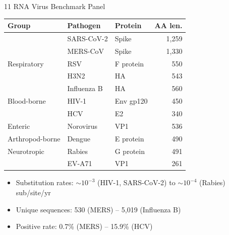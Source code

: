 \begin{frame}{11 RNA Virus Benchmark Panel}
  \footnotesize
  \begin{tabular}{lllr}
    \toprule
    \textbf{Group} & \textbf{Pathogen} & \textbf{Protein} & \textbf{AA len.} \\
    \midrule
    \multirow{5}{*}{Respiratory} & SARS-CoV-2 & Spike & 1,259 \\
    & MERS-CoV & Spike & 1,330 \\
    & RSV & F protein & 550 \\
    & H3N2 & HA & 543 \\
    & Influenza B & HA & 560 \\
    \midrule
    Blood-borne & HIV-1 & Env gp120 & 450 \\
    & HCV & E2 & 340 \\
    \midrule
    Enteric & Norovirus & VP1 & 536 \\
    Arthropod-borne & Dengue & E protein & 490 \\
    \midrule
    Neurotropic & Rabies & G protein & 491 \\
    & EV-A71 & VP1 & 261 \\
    \bottomrule
  \end{tabular}

  \vspace{0.5em}
  \begin{itemize}
    \item Substitution rates: $\sim 10^{-3}$ (HIV-1, SARS-CoV-2) to $\sim 10^{-4}$ (Rabies) sub/site/yr
    \item Unique sequences: 530 (MERS) -- 5,019 (Influenza B)
    \item Positive rate: 0.7\% (MERS) -- 15.9\% (HCV)
  \end{itemize}
\end{frame}

